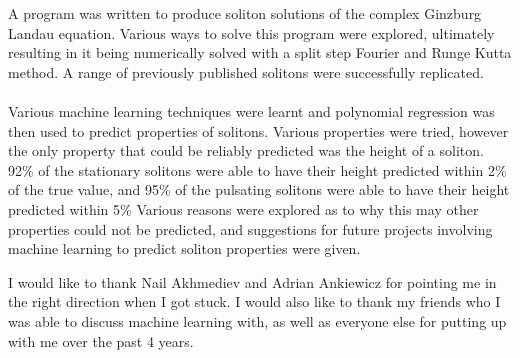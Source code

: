 \documentclass[a4paper,12pt]{report}
\begin{document}
A program was written to produce soliton solutions of the complex Ginzburg Landau equation. Various ways to solve this program were explored, ultimately resulting in it being numerically solved with a split step Fourier and Runge Kutta method. A range of previously published solitons were successfully replicated. 
\\\\
Various machine learning techniques were learnt and polynomial regression was then used to predict properties of solitons. Various properties were tried, however the only property that could be reliably predicted was the height of a soliton. 92\% of the stationary solitons were able to have their height predicted within 2\% of the true value, and 95\% of the pulsating solitons were able to have their height predicted within 5\%  Various reasons were explored as to why this may other properties could not be predicted, and suggestions for future projects involving machine learning to predict soliton properties were given. 

I would like to thank Nail Akhmediev and Adrian Ankiewicz for pointing me in the right direction when I got stuck. I would also like to thank my friends who I was able to discuss machine learning with, as well as everyone else for putting up with me over the past 4 years. 
\end{document}

